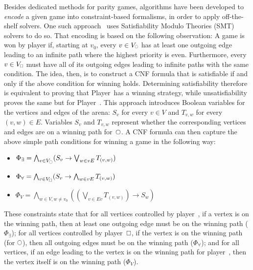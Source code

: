 \documentclass[runningheads]{llncs}
\begin{document}
Besides dedicated methods for parity games, algorithms have been developed to \textit{encode} a given game into constraint-based formalisms, in order to apply off-the-shelf solvers. One such approach~\cite{Heljanko:2012} uses Satisfiability Modulo Theories (SMT) solvers to do so. 
That encoding is based on the following observation:
%
A game is won by player \even if, starting at $v_0$, every $v \in V_{\subeven}$ has at least one outgoing edge leading to an infinite path where the highest priority is even. Furthermore, every $v \in V_{\subodd}$ must have all of its outgoing edges leading to infinite paths with the same condition.
%
The idea, then, is to construct a CNF formula that is satisfiable if and only if the above condition for winning holds. Determining satisfiability therefore is equivalent to proving that Player~\even has a winning strategy, while unsatisfiability proves the same but for Player~\odd.
%
This approach introduces Boolean variables for the vertices and edges of the arena: $S_v$ for every $v \in V$ and $T_{v,w}$ for every $(v, w) \in E$. Variables $S_v$ and $T_{v,w}$ represent whether the corresponding vertices and edges are on a winning path for~$\even$. 
%
A CNF formula can then capture the above simple path conditions for winning a game in the following way:

\begin{itemize}
    \item $\Phi_\exists = \bigwedge_{v \in V_{\subeven}} (S_v \rightarrow \bigvee_{w \in vE} T_{(v,w)})$
    \item $\Phi_\forall = \bigwedge_{v \in V_{\subodd}} (S_v \rightarrow \bigwedge_{w \in vE} T_{(v,w)})$
    \item $\Phi_V = \bigwedge_{w \in V, w \neq v_0} \left( \left(\bigvee_{v \in Ev} T_{(v,w)}\right) \rightarrow S_w \right)$
\end{itemize}

These constraints state that for all vertices controlled by player~\even, if a vertex is on the winning path, then at least one outgoing edge must be on the winning path ($\Phi_\exists$); for all vertices controlled by player~$\odd$, if the vertex is on the winning path (for $\even$), then all outgoing edges must be on the winning path ($\Phi_\forall$); and for all vertices, if an edge leading to the vertex is on the winning path for player~\even, then the vertex itself is on the winning path ($\Phi_V$).
\end{document}

